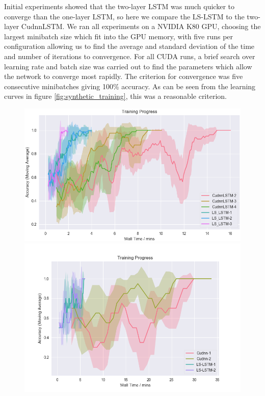 \documentclass{article}
\begin{document}
Initial experiments showed that the two-layer LSTM was much quicker to converge
than the one-layer LSTM, so here we compare the LS-LSTM to the two-layer
CudnnLSTM.  We ran all experiments on a NVIDIA K80 GPU, choosing the largest
minibatch size which fit into the GPU memory, with five runs per configuration
allowing us to find the average and standard deviation of the time and number of
iterations to convergence. For all CUDA runs, a brief search over learning rate
and batch size was carried out to find the parameters which allow the network to
converge most rapidly. The criterion for convergence was five consecutive
minibatches giving 100\% accuracy. As can be seen from the learning curves
in figure \ref{fig:synthetic_training}, this was a reasonable criterion.
\begin{figure}
  \centering
  \begin{minipage}{0.5\textwidth}
    \includegraphics[width=1.0\textwidth]{./1k_synthetic.png}
  \end{minipage}%
    \begin{minipage}{0.5\textwidth}
    \includegraphics[width=1.0\textwidth]{./8k_synthetic.png}      

\end{minipage}
\end{figure}
\end{document}
